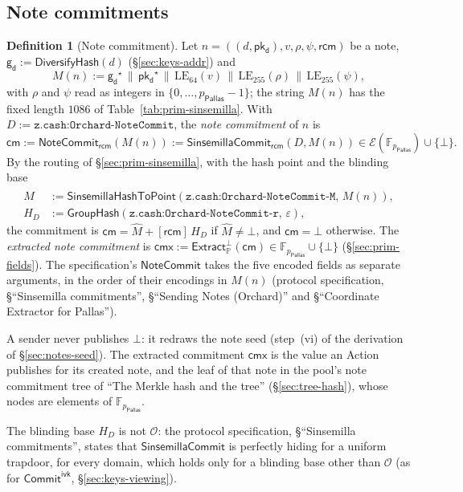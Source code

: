 \documentclass[11pt,a4paper]{article}
\theoremstyle{definition}
\newtheorem{definition}[theorem]{Definition}
\newcommand{\F}{\mathbb{F}}
\newcommand{\PP}{\mathbb{P}}
\newcommand{\cmsym}{\mathsf{cm}}
\newcommand{\cmx}{\mathsf{cmx}}
\newcommand{\Pallas}{\ensuremath{\mathsf{Pallas}}}
\newcommand{\Ep}{\ensuremath{\mathcal{E}}}
\newcommand{\NoteCommit}{\ensuremath{\mathsf{NoteCommit}}}
\newcommand{\CommitIvk}{\ensuremath{\mathsf{Commit}^{\mathsf{ivk}}}}
\newcommand{\Extract}{\ensuremath{\mathsf{Extract}}}
\newcommand{\GroupHash}{\ensuremath{\mathsf{GroupHash}}}
\newcommand{\pkd}{\ensuremath{\mathsf{pk_d}}}
\newcommand{\gd}{\ensuremath{\mathsf{g_d}}}
\newcommand{\rcm}{\ensuremath{\mathsf{rcm}}}
\begin{document}
\subsection{Note commitments}\label{sec:notes-cm}

\begin{definition}[Note commitment]\label{def:notecommit}
Let $n = ((d, \pkd), v, \rho, \psi, \rcm)$ be a note,
$\gd := \mathsf{DiversifyHash}(d)$ (\S\ref{sec:keys-addr}) and
\[
  M(n) := \gd^{\star} \,\|\, \pkd^{\star} \,\|\, \mathrm{LE}_{64}(v)
    \,\|\, \mathrm{LE}_{255}(\rho) \,\|\, \mathrm{LE}_{255}(\psi),
\]
with $\rho$ and $\psi$ read as integers in $\{0, \dots, p_{\Pallas} - 1\}$;
the string $M(n)$ has the fixed length $1086$ of
Table~\ref{tab:prim-sinsemilla}. With
$D := \texttt{z.cash:Orchard-NoteCommit}$, the \emph{note commitment} of $n$
is
\[
  \cmsym := \NoteCommit_{\rcm}(M(n))
    := \mathsf{SinsemillaCommit}_{\rcm}(D, M(n))
    \in \Ep(\F_{p_{\Pallas}}) \cup \{\bot\}.
\]
By the routing of \S\ref{sec:prim-sinsemilla}, with the hash point and the
blinding base
\begin{align*}
  \hat{M} &:= \mathsf{SinsemillaHashToPoint}(
    \texttt{z.cash:Orchard-NoteCommit-M},\, M(n)), \\
  H_D &:= \GroupHash(\texttt{z.cash:Orchard-NoteCommit-r},\, \varepsilon),
\end{align*}
the commitment is $\cmsym = \hat{M} + [\rcm]\,H_D$ if $\hat{M} \neq \bot$,
and $\cmsym = \bot$ otherwise. The \emph{extracted note commitment} is
$\cmx := \Extract_{\PP}^{\bot}(\cmsym) \in \F_{p_{\Pallas}} \cup \{\bot\}$
(\S\ref{sec:prim-fields}). The specification's $\NoteCommit$ takes the five
encoded fields as separate arguments, in the order of their encodings in
$M(n)$ (protocol specification, \S``Sinsemilla commitments'', \S``Sending
Notes (Orchard)'' and \S``Coordinate Extractor for Pallas'').
\end{definition}

A sender never publishes $\bot$: it redraws the note seed (step~(vi) of the
derivation of \S\ref{sec:notes-seed}). The extracted commitment $\cmx$ is the
value an Action publishes for its created note, and the leaf of that note in
the pool's note commitment tree of ``The Merkle hash and the tree''
(\S\ref{sec:tree-hash}), whose nodes are elements of $\F_{p_{\Pallas}}$.

The blinding base $H_D$ is not $\mathcal{O}$: the protocol specification,
\S``Sinsemilla commitments'', states that $\mathsf{SinsemillaCommit}$ is
perfectly hiding for a uniform trapdoor, for every domain, which holds only
for a blinding base other than $\mathcal{O}$ (as for $\CommitIvk$,
\S\ref{sec:keys-viewing}).
\end{document}
